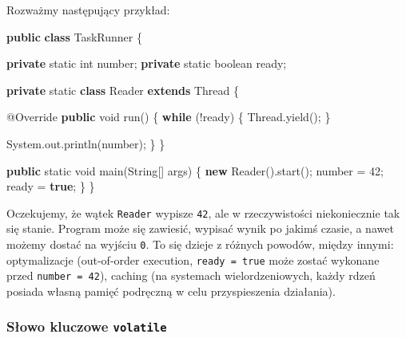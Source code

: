 \documentclass[11pt]{article}
\newenvironment{Shaded}{}{}
\newcommand{\KeywordTok}[1]{\textcolor[rgb]{0.00,0.44,0.13}{\textbf{{#1}}}}
\newcommand{\DataTypeTok}[1]{\textcolor[rgb]{0.56,0.13,0.00}{{#1}}}
\newcommand{\DecValTok}[1]{\textcolor[rgb]{0.25,0.63,0.44}{{#1}}}
\newcommand{\FunctionTok}[1]{\textcolor[rgb]{0.02,0.16,0.49}{{#1}}}
\newcommand{\NormalTok}[1]{{#1}}
\newcommand{\ControlFlowTok}[1]{\textcolor[rgb]{0.00,0.44,0.13}{\textbf{{#1}}}}
\newcommand{\OperatorTok}[1]{\textcolor[rgb]{0.40,0.40,0.40}{{#1}}}
\newcommand{\BuiltInTok}[1]{{#1}}
\newcommand{\AttributeTok}[1]{\textcolor[rgb]{0.49,0.56,0.16}{{#1}}}
\begin{document}
Rozważmy następujący przykład:

\begin{Shaded}
\begin{Highlighting}[]
\KeywordTok{public} \KeywordTok{class}\NormalTok{ TaskRunner }\OperatorTok{\{}

    \KeywordTok{private} \DataTypeTok{static} \DataTypeTok{int}\NormalTok{ number}\OperatorTok{;}
    \KeywordTok{private} \DataTypeTok{static} \DataTypeTok{boolean}\NormalTok{ ready}\OperatorTok{;}

    \KeywordTok{private} \DataTypeTok{static} \KeywordTok{class} \BuiltInTok{Reader} \KeywordTok{extends} \BuiltInTok{Thread} \OperatorTok{\{}

        \AttributeTok{@Override}
        \KeywordTok{public} \DataTypeTok{void} \FunctionTok{run}\OperatorTok{()} \OperatorTok{\{}
            \ControlFlowTok{while} \OperatorTok{(!}\NormalTok{ready}\OperatorTok{)} \OperatorTok{\{}
                \BuiltInTok{Thread}\OperatorTok{.}\FunctionTok{yield}\OperatorTok{();}
            \OperatorTok{\}}

            \BuiltInTok{System}\OperatorTok{.}\FunctionTok{out}\OperatorTok{.}\FunctionTok{println}\OperatorTok{(}\NormalTok{number}\OperatorTok{);}
        \OperatorTok{\}}
    \OperatorTok{\}}

    \KeywordTok{public} \DataTypeTok{static} \DataTypeTok{void} \FunctionTok{main}\OperatorTok{(}\BuiltInTok{String}\OperatorTok{[]}\NormalTok{ args}\OperatorTok{)} \OperatorTok{\{}
        \KeywordTok{new} \BuiltInTok{Reader}\OperatorTok{().}\FunctionTok{start}\OperatorTok{();}
\NormalTok{        number }\OperatorTok{=} \DecValTok{42}\OperatorTok{;}
\NormalTok{        ready }\OperatorTok{=} \KeywordTok{true}\OperatorTok{;}
    \OperatorTok{\}}
\OperatorTok{\}}
\end{Highlighting}
\end{Shaded}

Oczekujemy, że wątek \texttt{Reader} wypisze \texttt{42}, ale w
rzeczywistości niekoniecznie tak się stanie. Program może się zawiesić,
wypisać wynik po jakimś czasie, a nawet możemy dostać na wyjściu
\texttt{0}. To się dzieje z różnych powodów, między innymi:
optymalizacje (out-of-order execution, \texttt{ready\ =\ true} może
zostać wykonane przed \texttt{number\ =\ 42}), caching (na systemach
wielordzeniowych, każdy rdzeń posiada własną pamięć podręczną w celu
przyspieszenia działania).

\hypertarget{sux142owo-kluczowe-volatile}{%
\subsubsection{\texorpdfstring{Słowo kluczowe
\texttt{volatile}}{Słowo kluczowe volatile}}\label{sux142owo-kluczowe-volatile}}
\end{document}
